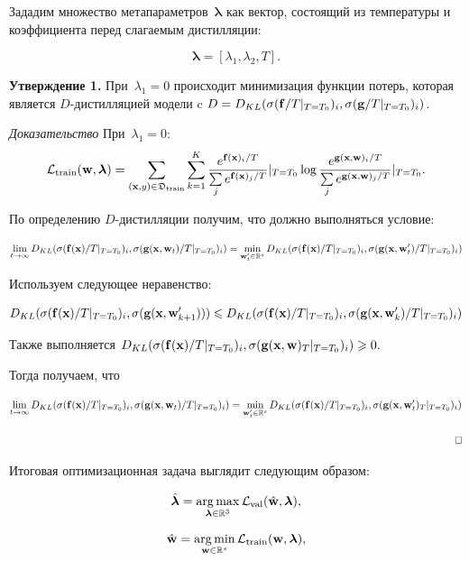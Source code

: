 \documentclass[12pt, twoside]{article}
\begin{document}
Зададим множество метапараметров~$\boldsymbol{\lambda}$ как вектор, состоящий из температуры и коэффициента перед слагаемым дистилляции:

\[\boldsymbol{\lambda} = [\lambda_1, \lambda_2, T].\]

\textbf{Утверждение 1.}
При~$\lambda_1 = 0$ происходит минимизация функции потерь, которая является $D$-дистилляцией модели c $D = D_{KL}(\sigma(\mathbf{f}/T|_{T=T_0})_i, \sigma(\mathbf{g}/T|_{T=T_0})_i)$.

\textit{Доказательство}
При~$\lambda_1 = 0$:
$$\mathcal{L}_\text{train}(\mathbf{w}, \boldsymbol{\lambda}) = \sum\limits_{(\mathbf{x}, y) \in \mathfrak{D}_\text{train}}\sum\limits_{k=1}^{K}\frac{e^{\mathbf{f}(\mathbf{x})_i/T}}{\sum\limits_{j}e^{\mathbf{f}(\mathbf{x})_j/T}}|_{T=T_0}\log \frac{e^{\mathbf{g}(\mathbf{x}, \mathbf{w})_i/T}}{\sum\limits_{j}e^{\mathbf{g}(\mathbf{x}, \mathbf{w})_j/T}}|_{T=T_0}.$$

По определению $D$-дистилляции получим, что должно выполняться условие:

$$\lim_{t \to \infty} D_{KL}(\sigma(\bff(\bx)/T|_{T=T_0})_i, \sigma(\bg(\bx, \bw_t)/T|_{T=T_0})_i)=\min_{\bw^\prime_t \in \bbR^s} D_{KL}(\sigma(\bff(\bx)/T|_{T=T_0})_i, \sigma(\bg(\bx, \bw^\prime_t)/T|_{T=T_0})_i)$$

Используем следующее неравенство:

$$D_{KL}(\sigma(\mathbf{f}(\mathbf{x})/T|_{T=T_0})_i, \sigma(\mathbf{g}(\mathbf{x}, \mathbf{w}^\prime_{k+1}))) \leqslant D_{KL}(\sigma(\mathbf{f}(\mathbf{x})/T|_{T=T_0})_i, \sigma(\mathbf{g}(\mathbf{x}, \mathbf{w}^\prime_k)/T|_{T=T_0})_i)$$

Также выполняется $D_{KL}(\sigma(\mathbf{f}(\mathbf{x})/T|_{T=T_0})_i, \sigma(\mathbf{g}(\mathbf{x}, \mathbf{w})_T|_{T=T_0})_i) \geqslant 0.$

Тогда получаем, что

$$\lim_{t \to \infty} D_{KL}(\sigma(\bff(\bx)/T|_{T=T_0})_i, \sigma(\bg(\bx, \bw_t)/T|_{T=T_0})_i)=\min_{\bw^\prime_t \in \bbR^s} D_{KL}(\sigma(\bff(\bx)/T|_{T=T_0})_i, \sigma(\bg(\bx, \bw^\prime_t)_T|_{T=T_0})_i)$$

\begin{equation*}
    \hspace{16.3 cm}\Box
\end{equation*}

Итоговая оптимизационная задача выглядит следующим образом:

\begin{equation} \label{eq:opt_hyp}
    \hat{\boldsymbol{\lambda}} = \argmax\limits_{\boldsymbol{\lambda} \in \bbR^3} \cL_\text{val}(\hat{\bw}, \boldsymbol{\lambda}),
\end{equation}

\begin{equation} \label{eq:opt_param}
    \hat{\bw} = \argmin\limits_{\bw \in \bbR^s} \cL_\text{train}(\bw, \boldsymbol{\lambda}),
\end{equation}
\end{document}
